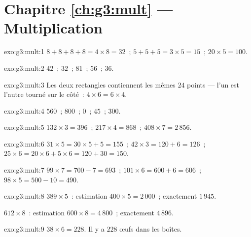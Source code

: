 \section*{Chapitre \ref{ch:g3:mult} --- Multiplication}

\begin{solution}{exo:g3:mult:1}
$8 + 8 + 8 + 8 = 4 \times 8 = 32$~; \quad
$5 + 5 + 5 = 3 \times 5 = 15$~; \quad
$20 \times 5 = 100$.
\end{solution}

\begin{solution}{exo:g3:mult:2}
$42$~; \quad $32$~; \quad $81$~; \quad $56$~; \quad $36$.
\end{solution}

\begin{solution}{exo:g3:mult:3}
Les deux rectangles contiennent les mêmes $24$ points --- l'un est
l'autre tourné sur le côté~: $4 \times 6 = 6 \times 4$.
\end{solution}

\begin{solution}{exo:g3:mult:4}
$560$~; \quad $800$~; \quad $0$~; \quad $45$~; \quad $300$.
\end{solution}

\begin{solution}{exo:g3:mult:5}
$132 \times 3 = 396$~; \quad
$217 \times 4 = 868$~; \quad
$408 \times 7 = 2\,856$.
\end{solution}

\begin{solution}{exo:g3:mult:6}
$31 \times 5 = 30 \times 5 + 5 = 155$~; \quad
$42 \times 3 = 120 + 6 = 126$~; \quad
$25 \times 6 = 20 \times 6 + 5 \times 6 = 120 + 30 = 150$.
\end{solution}

\begin{solution}{exo:g3:mult:7}
$99 \times 7 = 700 - 7 = 693$~; \quad
$101 \times 6 = 600 + 6 = 606$~; \quad
$98 \times 5 = 500 - 10 = 490$.
\end{solution}

\begin{solution}{exo:g3:mult:8}
$389 \times 5$~: estimation $400 \times 5 = 2\,000$~; exactement
$1\,945$.

$612 \times 8$~: estimation $600 \times 8 = 4\,800$~; exactement
$4\,896$.
\end{solution}

\begin{solution}{exo:g3:mult:9}
$38 \times 6 = 228$. Il y a $228$ œufs dans les boîtes.
\end{solution}

